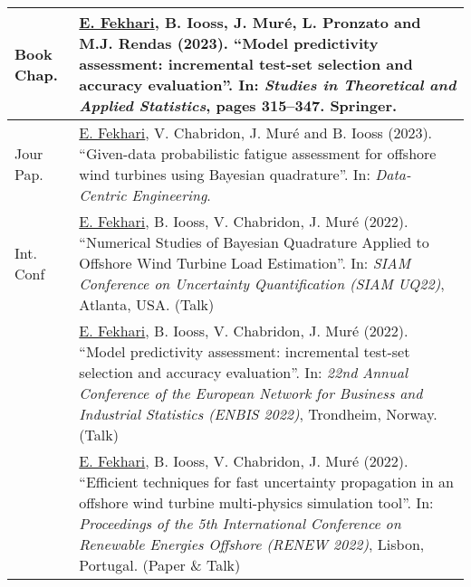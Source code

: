 \begin{center}
    \footnotesize
    \renewcommand*{\arraystretch}{1.4}
    \begin{tabularx}{\textwidth}{l X}
        Book Chap. & \underline{E. Fekhari}, B. Iooss, J. Muré, L. Pronzato and M.J. Rendas (2023). 
                    ``Model predictivity assessment: incremental test-set selection and accuracy evaluation''. 
                    In: \textit{Studies in Theoretical and Applied Statistics}, pages 315--347. Springer.\\
        \hline
        Jour Pap.   & \underline{E. Fekhari}, V. Chabridon, J. Muré and B. Iooss (2023).
                    ``Given-data probabilistic fatigue assessment for offshore wind turbines using Bayesian quadrature''. 
                    In: \textit{Data-Centric Engineering}.\\

        \hline
        Int. Conf   & \underline{E. Fekhari}, B. Iooss, V. Chabridon, J. Muré (2022).
                    ``Numerical Studies of Bayesian Quadrature Applied to Offshore Wind Turbine Load Estimation''.
                    In: \textit{SIAM Conference on Uncertainty Quantification (SIAM UQ22)}, Atlanta, USA. (Talk)\\
        
                    & \underline{E. Fekhari}, B. Iooss, V. Chabridon, J. Muré (2022). 
                    ``Model predictivity assessment: incremental test-set selection and accuracy evaluation''.
                    In: \textit{22nd Annual Conference of the European Network for Business and Industrial Statistics (ENBIS 2022)}, Trondheim, Norway. (Talk)\\
        
                    & \underline{E. Fekhari}, B. Iooss, V. Chabridon, J. Muré (2022). 
                    ``Efficient techniques for fast uncertainty propagation in an offshore wind turbine multi-physics simulation tool''.
                    In: \textit{Proceedings of the 5th International Conference on Renewable Energies Offshore (RENEW 2022)}, Lisbon, Portugal. (Paper \& Talk)\\
        

\end{tabularx}
\end{center}
